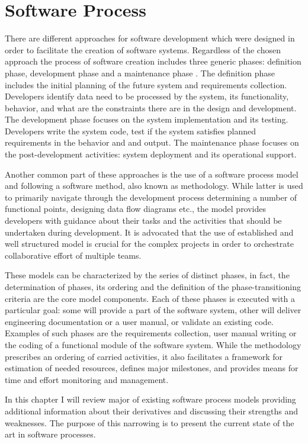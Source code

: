 \chapter{Software Process}
There are different approaches for software development which were designed in order to 
facilitate the creation of software systems. Regardless of the chosen approach the 
process of software creation includes three generic phases: definition phase, 
development phase and a maintenance phase \cite{citeulike:6095377}.
The definition phase includes the initial
planning of the future system and requirements collection. Developers identify data 
need to be processed by the system, its functionality, behavior, and what are 
the constraints there are in the design and development. The development phase focuses 
on the system implementation and its testing. Developers write the system code, 
test if the system satisfies planned requirements in the behavior and and output. 
The maintenance phase focuses on the post-development activities: system deployment 
and its operational support. 

Another common part of these approaches is the use 
of a software process model and following a software method, also known as methodology.
While latter is used to primarily navigate through the development process determining
a number of functional points, designing data flow diagrams etc., the model provides 
developers with guidance about their tasks and the activities that should be undertaken 
during development. It is advocated that the use of established and well structured 
model is crucial for the complex projects in order to orchestrate collaborative effort 
of multiple teams. 

These models can be characterized by the series of distinct phases, in fact, the 
determination of phases, its ordering and the definition of the phase-transitioning 
criteria are the core model components.
Each of these phases is executed with a particular goal: some will provide a part of the 
software system, other will deliver engineering documentation or a user manual, or 
validate an existing code. Examples of such phases are the requirements collection, 
user manual writing or the coding of a functional module of the software system. 
While the methodology prescribes an ordering of carried activities, it also facilitates
a framework for estimation of needed resources, defines major milestones, and provides 
means for time and effort monitoring and management. 

In this chapter I will review major of existing software process models providing additional 
information about their derivatives and discussing their strengths and weaknesses.
The purpose of this narrowing is to present the current state of the art in software 
processes.

